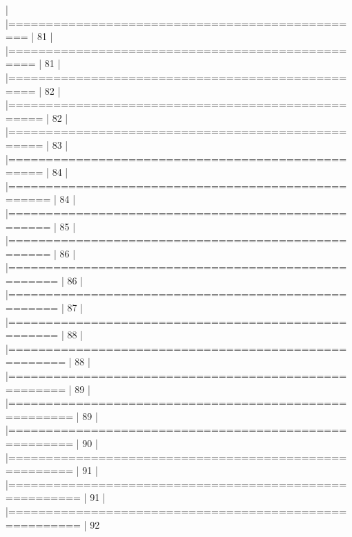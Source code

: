 \documentclass[article,nojss]{jss} %
\begin{document}
\begin{Schunk}
\begin{Soutput}
  |                                                                  
  |================================================            |  81%
  |                                                                  
  |=================================================           |  81%
  |                                                                  
  |=================================================           |  82%
  |                                                                  
  |==================================================          |  82%
  |                                                                  
  |==================================================          |  83%
  |                                                                  
  |==================================================          |  84%
  |                                                                  
  |===================================================         |  84%
  |                                                                  
  |===================================================         |  85%
  |                                                                  
  |===================================================         |  86%
  |                                                                  
  |====================================================        |  86%
  |                                                                  
  |====================================================        |  87%
  |                                                                  
  |====================================================        |  88%
  |                                                                  
  |=====================================================       |  88%
  |                                                                  
  |=====================================================       |  89%
  |                                                                  
  |======================================================      |  89%
  |                                                                  
  |======================================================      |  90%
  |                                                                  
  |======================================================      |  91%
  |                                                                  
  |=======================================================     |  91%
  |                                                                  
  |=======================================================     |  92%

\end{Soutput}
\end{Schunk}
\end{document}
